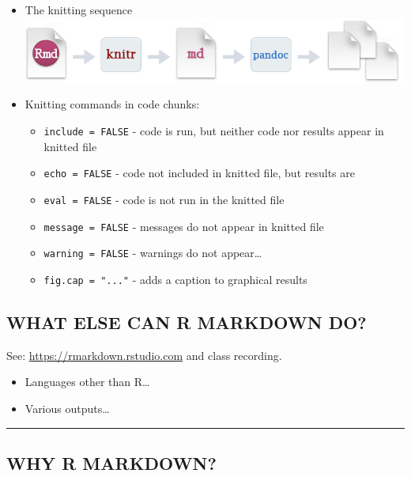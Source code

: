 \documentclass[
]{article}
\providecommand{\tightlist}{%
  \setlength{\itemsep}{0pt}\setlength{\parskip}{0pt}}
\begin{document}
\begin{itemize}
\item
  The knitting sequence\\
  \includegraphics{./img/rmarkdownflow.png}
\item
  Knitting commands in code chunks:

  \begin{itemize}
  \tightlist
  \item
    \texttt{include\ =\ FALSE} - code is run, but neither code nor
    results appear in knitted file
  \item
    \texttt{echo\ =\ FALSE} - code not included in knitted file, but
    results are
  \item
    \texttt{eval\ =\ FALSE} - code is not run in the knitted file
  \item
    \texttt{message\ =\ FALSE} - messages do not appear in knitted file
  \item
    \texttt{warning\ =\ FALSE} - warnings do not appear\ldots{}
  \item
    \texttt{fig.cap\ =\ "..."} - adds a caption to graphical results
  \end{itemize}
\end{itemize}

\hypertarget{what-else-can-r-markdown-do}{%
\subsection{WHAT ELSE CAN R MARKDOWN
DO?}\label{what-else-can-r-markdown-do}}

See: \url{https://rmarkdown.rstudio.com} and class recording.

\begin{itemize}
\tightlist
\item
  Languages other than R\ldots{}
\item
  Various outputs\ldots{}
\end{itemize}

\begin{center}\rule{0.5\linewidth}{0.5pt}\end{center}

\hypertarget{why-r-markdown}{%
\subsection{WHY R MARKDOWN?}\label{why-r-markdown}}
\end{document}
